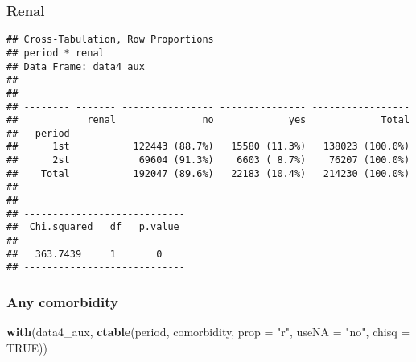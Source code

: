 \documentclass[
]{article}
\newenvironment{Shaded}{\begin{snugshade}}{\end{snugshade}}
\newcommand{\DataTypeTok}[1]{\textcolor[rgb]{0.13,0.29,0.53}{#1}}
\newcommand{\KeywordTok}[1]{\textcolor[rgb]{0.13,0.29,0.53}{\textbf{#1}}}
\newcommand{\NormalTok}[1]{#1}
\newcommand{\OperatorTok}[1]{\textcolor[rgb]{0.81,0.36,0.00}{\textbf{#1}}}
\newcommand{\OtherTok}[1]{\textcolor[rgb]{0.56,0.35,0.01}{#1}}
\newcommand{\StringTok}[1]{\textcolor[rgb]{0.31,0.60,0.02}{#1}}
\begin{document}
\hypertarget{renal-1}{%
\subsubsection{Renal}\label{renal-1}}

\begin{Shaded}
\end{Shaded}

\begin{verbatim}
## Cross-Tabulation, Row Proportions  
## period * renal  
## Data Frame: data4_aux  
## 
## 
## -------- ------- ---------------- --------------- -----------------
##            renal               no             yes             Total
##   period                                                           
##      1st           122443 (88.7%)   15580 (11.3%)   138023 (100.0%)
##      2st            69604 (91.3%)    6603 ( 8.7%)    76207 (100.0%)
##    Total           192047 (89.6%)   22183 (10.4%)   214230 (100.0%)
## -------- ------- ---------------- --------------- -----------------
## 
## ----------------------------
##  Chi.squared   df   p.value 
## ------------- ---- ---------
##   363.7439     1       0    
## ----------------------------
\end{verbatim}

\hypertarget{any-comorbidity-1}{%
\subsubsection{Any comorbidity}\label{any-comorbidity-1}}

\begin{Shaded}
\begin{Highlighting}[]
\KeywordTok{with}\NormalTok{(data4_aux, }\KeywordTok{ctable}\NormalTok{(period, comorbidity, }\DataTypeTok{prop =} \StringTok{"r"}\NormalTok{, }\DataTypeTok{useNA =} \StringTok{"no"}\NormalTok{, }\DataTypeTok{chisq =} \OtherTok{TRUE}\NormalTok{))}
\end{Highlighting}
\end{Shaded}
\end{document}
